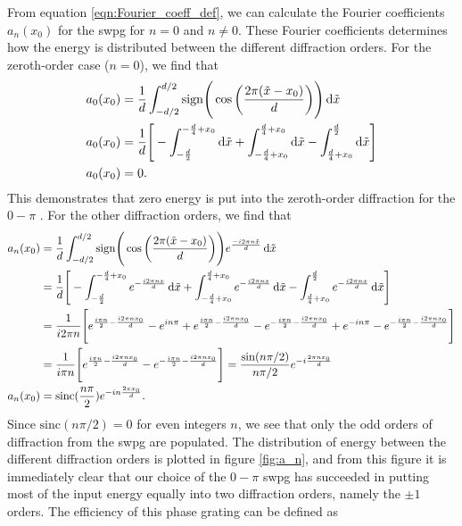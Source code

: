From equation \ref{eqn:Fourier_coeff_def}, we can calculate the Fourier coefficients $a_n(x_0)$ for the \gls{swpg} for $n=0$ and $n\neq0$.  These Fourier coefficients determines how the energy is distributed between the different diffraction orders.  For the zeroth-order case ($n=0$), we find that
\begin{equation}
\label{eqn:a0_no_zeta}
\begin{aligned}
a_0(x_0) &= \frac{1}{d}\int_{-d/2}^{d/2} \mathrm{sign}\Bigg( \cos\bigg( \frac{2\pi(\tilde{x}-x_0)}{d}\bigg)\Bigg) \mathop{}\!\mathrm{d}\tilde{x}\\
a_0(x_0) &=\frac{1}{d}\Bigg[ -\int_{-\frac{d}{2}}^{-\frac{d}{4}+x_0}\mathop{}\!\mathrm{d}\tilde{x} 
+\int_{-\frac{d}{4}+x_0}^{\frac{d}{4}+x_0}\mathop{}\!\mathrm{d}\tilde{x}
-\int_{\frac{d}{4}+x_0}^{\frac{d}{2}}\mathop{}\!\mathrm{d}\tilde{x}
\Bigg]\\
a_0(x_0) &=0.
\end{aligned}
\end{equation}
This demonstrates that zero energy is put into the zeroth-order diffraction for the $0-\pi$ \swpg.  For the other diffraction orders, we find that
\begingroup
\allowdisplaybreaks
\begin{equation}
\label{eqn:swpg_fourier_coeff_a_n}
	\begin{aligned}
		a_n(x_0) &= \frac{1}{d}\int_{-d/2}^{d/2} \mathrm{sign}\Bigg( \cos\bigg( \frac{2\pi(\tilde{x}-x_0)}{d}\bigg)\Bigg) e^{\frac{-i2\pi n\tilde{x}}{d}}\mathop{}\!\mathrm{d}\tilde{x}\\
		&=\frac{1}{d}\Bigg[ -\int_{-\frac{d}{2}}^{-\frac{d}{4}+x_0} e^{-\frac{i2\pi n x}{d}}\mathop{}\!\mathrm{d}\tilde{x} 
		+\int_{-\frac{d}{4}+x_0}^{\frac{d}{4}+x_0} e^{-\frac{i2\pi n x}{d}}\mathop{}\!\mathrm{d}\tilde{x}
		-\int_{\frac{d}{4}+x_0}^{\frac{d}{2}} e^{-\frac{i2\pi n x}{d}}\mathop{}\!\mathrm{d}\tilde{x}
		\Bigg]\\
		&=\frac{1}{i2\pi n}\Bigg[
		e^{\frac{i\pi n}{2}-\frac{i2\pi n x_0}{d}} - e^{i n \pi}
		+ e^{\frac{i\pi n}{2}-\frac{i2\pi n x_0}{d}} - e^{-\frac{i\pi n}{2}-\frac{i2\pi n x_0}{d}}
		+e^{-i n \pi} - e^{-\frac{i\pi n}{2}-\frac{i2\pi n x_0}{d}}
		\Bigg]\\
		&=\frac{1}{i\pi n}\Bigg[e^{\frac{i\pi n}{2}-\frac{i2\pi n x_0}{d}}-e^{-\frac{i\pi n}{2}-\frac{i2\pi n x_0}{d}} \Bigg] = \frac{\sin (n\pi/2)}{n\pi/2}e^{-i\frac{2\pi n x_0}{d}}\\
		a_n(x_0) &= \mathrm{sinc}(\frac{n\pi}{2})e^{-i n \frac{2\pi x_0}{d}}.
	\end{aligned}
\end{equation}
\endgroup
Since $\mathrm{sinc}(n\pi/2)=0$ for even integers $n$, we see that only the odd orders of diffraction from the \gls{swpg}  are populated. The distribution of energy between the different diffraction orders is plotted in figure \ref{fig:a_n}, and from this figure it is immediately clear that our choice of the $0-\pi$ \gls{swpg} has succeeded in putting most of the input energy equally into two diffraction orders, namely the $\pm1$ orders.  The efficiency of this phase grating can be defined as
